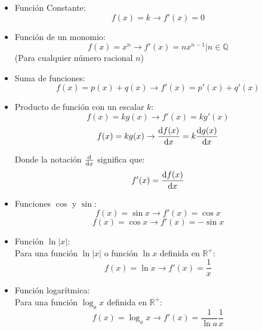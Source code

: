 \documentclass[arial,a4paper,print]{article}
\begin{document}
\begin{itemize}
\item Función Constante: \\
\begin{equation*}
	f(x) = k \rightarrow f'(x) = 0
\end{equation*}

\item Función de un monomio: \\
\begin{equation*}
	f(x) = x^{n} \rightarrow f'(x) = nx^{n-1}\big| n\in\mathbb{Q}
\end{equation*}
(Para cualquier número racional $n$)

\item Suma de funciones:\\
\begin{equation*}
	f(x) = p(x) + q(x) \rightarrow f'(x) = p'(x) + q'(x)
\end{equation*}

\item Producto de función con un escalar $k$:\\
\begin{equation*}
	f(x) = kg(x) \rightarrow f'(x) = kg'(x)
\end{equation*}
\begin{equation*}
	f(x) = kg(x) \rightarrow \dv{f(x)}{x} = k\dv{g(x)}{x}
\end{equation*}

Donde la notación $\dv{x}$ significa que:
\begin{equation*}
	f'(x) = \dv{f(x)}{x}
\end{equation*}

\item Funciones $\cos$ y $\sin$: \\
\begin{equation*}
	f(x) = \sin x \rightarrow f'(x) = \cos x
\end{equation*}
\begin{equation*}
	f(x) = \cos x \rightarrow f'(x) = - \sin x
\end{equation*}

\item Función $\ln|x|$:\\
Para una función $\ln|x|$ o función $\ln x$ definida en $\mathbb{R}^+$: 
\begin{equation*}
	f(x) = \ln x \rightarrow f'(x) = \frac1x
\end{equation*}


\item Función logarítmica:\\
Para una función $\log_a x$ definida en $\mathbb{R}^{+}$:
\begin{equation*}
	f(x) = \log_a x \rightarrow f'(x) = \frac{1}{\ln a}\frac1x
\end{equation*} 


\end{itemize}
\end{document}
